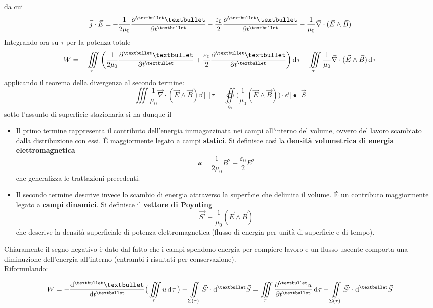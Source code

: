 da cui
\[\vec{j} \cdot \vec{E} = - \frac{1}{2 \mu_0} \pdv[•]{•}{t}(B^2) - \frac{\varepsilon_0}{2} \pdv[•]{•}{t}(E^2) - \frac{1}{\mu_0} \vec{\nabla} \cdot (\vec{E} \wedge \vec{B})\]
Integrando ora su $\tau$ per la potenza totale
\[W = - \iiint\limits_\tau \bigg(\frac{1}{2 \mu_0} \pdv[•]{•}{t}(B^2) + \frac{\varepsilon_0}{2} \pdv[•]{•}{t}(E^2)\bigg)  \dd[]{\tau} - \iiint\limits_\tau \frac{1}{\mu_0} \vec{\nabla} \cdot (\vec{E} \wedge \vec{B}) \dd[]{\tau}\]
applicando il teorema della divergenza al secondo termine:
\[\iiint\limits_\tau \frac{1}{\mu_0} \vec{\nabla} \cdot (\vec{E} \wedge \vec{B}) \dd[]{\tau} = \oiint\limits_{\partial \tau} \big(\frac{1}{\mu_0} (\vec{E} \wedge \vec{B}) \big) \cdot \dd[•]{\vec{S}}\]
sotto l'assunto di superficie stazionaria si ha dunque il 


\begin{itemize}
\item Il primo termine rappresenta il contributo dell'energia immagazzinata nei campi all'interno del volume, ovvero del lavoro scambiato dalla distribuzione con essi. \'E maggiormente legato a campi \textbf{statici}. Si definisce così la \textbf{densità volumetrica di energia elettromagnetica}
\[\mathcal{u} = \frac{1}{2 \mu_0} B^2 + \frac{\varepsilon_0}{2}E^2 \]
che generalizza le trattazioni precedenti. 

\item Il secondo termine descrive invece lo scambio di energia attraverso la superficie che delimita il volume. \'E un contributo maggiormente legato a \textbf{campi dinamici}. Si definisce il \textbf{vettore di Poynting}
\[\vec{S'} \equiv \frac{1}{\mu_0} (\vec{E} \wedge \vec{B})\]
che descrive la densità superficiale di potenza elettromagnetica (flusso di energia per unità di superficie e di tempo). 

\end{itemize}

Chiaramente il segno negativo è dato dal fatto che i campi spendono energia per compiere lavoro e un flusso uscente comporta una diminuzione dell'energia all'interno (entrambi i risultati per conservazione). 
\\Riformulando:

\[W = - \dv[•]{•}{t} \big(\iiint\limits_\tau u  \dd[]{\tau} \big) - \iint\limits_{\Sigma (\tau)} \vec{S'} \cdot \dd[•]{\vec{S}} = \iiint\limits_\tau \pdv[•]{u}{t} \dd[]{\tau} - \iint\limits_{\Sigma (\tau)} \vec{S'} \cdot \dd[•]{\vec{S}}\]

